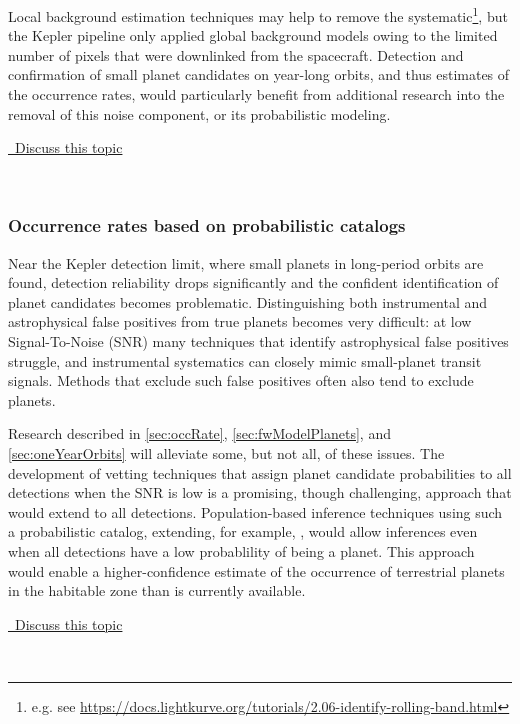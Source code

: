 \documentclass[modern]{aastex62}
\newcommand{\commentlink}[1]{\href{https://github.com/KeplerGO/ScientificOpportunities/issues/#1}{\sc \faExternalLink\ Discuss this topic}\,\,}
\begin{document}
Local background estimation techniques may help to remove the systematic\footnote{e.g. see \url{https://docs.lightkurve.org/tutorials/2.06-identify-rolling-band.html}}, but the Kepler pipeline only applied global background models owing to the limited number of pixels that were downlinked from the spacecraft.  Detection and confirmation of small planet candidates on year-long orbits, and thus estimates of the occurrence rates, would particularly benefit from additional research into the removal of this noise component, or its probabilistic modeling.
\\
\begin{center}
\commentlink{10}
\end{center}
\ \\

\subsubsection{Occurrence rates based on probabilistic catalogs} 
Near the Kepler detection limit, where small planets in long-period orbits are found, detection reliability drops significantly and the confident identification of planet candidates becomes problematic.  Distinguishing both instrumental and astrophysical false positives from true planets becomes very difficult: at low Signal-To-Noise (SNR) many techniques that identify astrophysical false positives struggle, and instrumental systematics can closely mimic small-planet transit signals.  Methods that exclude such false positives often also tend to exclude planets.

Research described in \ref{sec:occRate}, \ref{sec:fwModelPlanets}, and \ref{sec:oneYearOrbits} will alleviate some, but not all, of these issues. The development of vetting techniques that assign planet candidate probabilities to all detections when the SNR is low is a promising, though challenging, approach that would extend \citet{morton2016} to all detections.  Population-based inference techniques using such a probabilistic catalog, extending, for example, \cite{farr2015}, would allow inferences even when all detections have a low probablility of being a planet.  This approach would enable a higher-confidence estimate of the occurrence of terrestrial planets in the habitable zone than is currently available.
\\
\begin{center}
\commentlink{11}
\end{center}
\ \\
\end{document}
